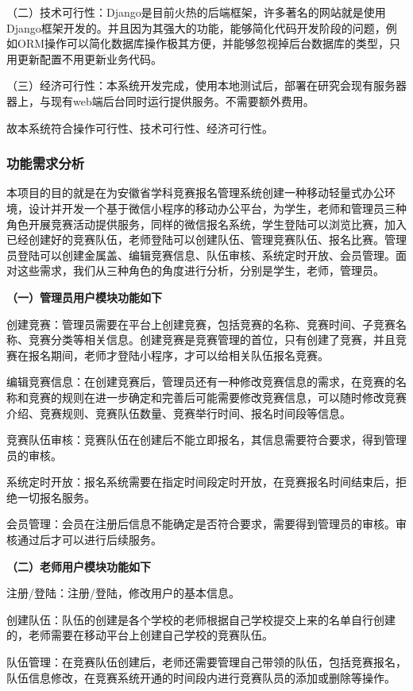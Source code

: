 \documentclass[a4paper]{ltxdoc}
\begin{document}
{		（二）技术可行性：Django是目前火热的后端框架，许多著名的网站就是使用Django框架开发的。并且因为其强大的功能，能够简化代码开发阶段的问题，例如ORM操作可以简化数据库操作极其方便，并能够忽视掉后台数据库的类型，只用更新配置不用更新业务代码。
		
		（三）经济可行性：本系统开发完成，使用本地测试后，部署在研究会现有服务器器上，与现有web端后台同时运行提供服务。不需要额外费用。
		
		故本系统符合操作可行性、技术可行性、经济可行性。
		
		\subsubsection{功能需求分析}
		本项目的目的就是在为安徽省学科竞赛报名管理系统创建一种移动轻量式办公环境，设计并开发一个基于微信小程序的移动办公平台，为学生，老师和管理员三种角色开展竞赛活动提供服务，同样的微信报名系统，学生登陆可以浏览比赛，加入已经创建好的竞赛队伍，老师登陆可以创建队伍、管理竞赛队伍、报名比赛。管理员登陆可以创建金属盖、编辑竞赛信息、队伍审核、系统定时开放、会员管理。面对这些需求，我们从三种角色的角度进行分析，分别是学生，老师，管理员。

		
		\textbf{（一）管理员用户模块功能如下}
		
		创建竞赛：管理员需要在平台上创建竞赛，包括竞赛的名称、竞赛时间、子竞赛名称、竞赛分类等相关信息。创建竞赛是竞赛管理的首位，只有创建了竞赛，并且竞赛在报名期间，老师才登陆小程序，才可以给相关队伍报名竞赛。
		
		编辑竞赛信息：在创建竞赛后，管理员还有一种修改竞赛信息的需求，在竞赛的名称和竞赛的规则在进一步确定和完善后可能需要修改竞赛信息，可以随时修改竞赛介绍、竞赛规则、竞赛队伍数量、竞赛举行时间、报名时间段等信息。
		
		竞赛队伍审核：竞赛队伍在创建后不能立即报名，其信息需要符合要求，得到管理员的审核。
		
		系统定时开放：报名系统需要在指定时间段定时开放，在竞赛报名时间结束后，拒绝一切报名服务。
		
		会员管理：会员在注册后信息不能确定是否符合要求，需要得到管理员的审核。审核通过后才可以进行后续服务。
		
		\textbf{（二）老师用户模块功能如下}
		
		注册/登陆：注册/登陆，修改用户的基本信息。
		
		创建队伍：队伍的创建是各个学校的老师根据自己学校提交上来的名单自行创建的，老师需要在移动平台上创建自己学校的竞赛队伍。
		
		队伍管理：在竞赛队伍创建后，老师还需要管理自己带领的队伍，包括竞赛报名，队伍信息修改，在竞赛系统开通的时间段内进行竞赛队员的添加或删除等操作。
		
}
\end{document}
